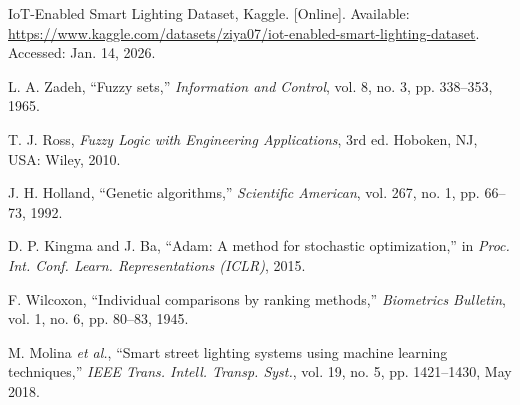 \documentclass[conference]{IEEEtran}
\begin{document}


IoT-Enabled Smart Lighting Dataset, Kaggle.
[Online]. Available: \url{https://www.kaggle.com/datasets/ziya07/iot-enabled-smart-lighting-dataset}.
Accessed: Jan. 14, 2026.

L. A. Zadeh, ``Fuzzy sets,'' \emph{Information and Control}, vol. 8, no. 3, pp. 338--353, 1965.

T. J. Ross, \emph{Fuzzy Logic with Engineering Applications}, 3rd ed.
Hoboken, NJ, USA: Wiley, 2010.

J. H. Holland, ``Genetic algorithms,'' \emph{Scientific American},
vol. 267, no. 1, pp. 66--73, 1992.

D. P. Kingma and J. Ba, ``Adam: A method for stochastic optimization,''
in \emph{Proc. Int. Conf. Learn. Representations (ICLR)}, 2015.

F. Wilcoxon, ``Individual comparisons by ranking methods,''
\emph{Biometrics Bulletin}, vol. 1, no. 6, pp. 80--83, 1945.

M. Molina \emph{et al.}, ``Smart street lighting systems using machine learning techniques,''
\emph{IEEE Trans. Intell. Transp. Syst.}, vol. 19, no. 5, pp. 1421--1430, May 2018.
\end{document}
